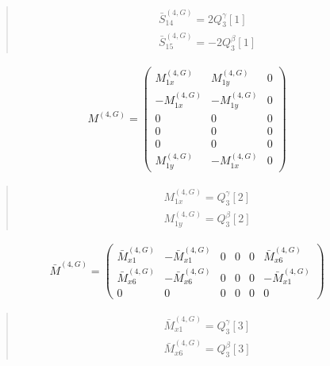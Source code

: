 \documentclass[fleqn,10pt]{jsarticle}
\begin{document}
\begin{quote}
\begin{align*}
& \bar{S}^{(4,G)}_{14} = 2 Q_{3}^{\gamma}[1] \\
& \bar{S}^{(4,G)}_{15} = - 2 Q_{3}^{\beta}[1]
\end{align*}
\end{quote}
\begin{align*}
M^{(4,G)} = \begin{pmatrix} M^{(4,G)}_{1x} & M^{(4,G)}_{1y} & 0 \\ - M^{(4,G)}_{1x} & - M^{(4,G)}_{1y} & 0 \\ 0 & 0 & 0 \\ 0 & 0 & 0 \\ 0 & 0 & 0 \\ M^{(4,G)}_{1y} & - M^{(4,G)}_{1x} & 0 \end{pmatrix}
\end{align*}
\begin{quote}
\begin{align*}
& M^{(4,G)}_{1x} = Q_{3}^{\gamma}[2] \\
& M^{(4,G)}_{1y} = Q_{3}^{\beta}[2]
\end{align*}
\end{quote}
\begin{align*}
\bar{M}^{(4,G)} = \begin{pmatrix} \bar{M}^{(4,G)}_{x1} & - \bar{M}^{(4,G)}_{x1} & 0 & 0 & 0 & \bar{M}^{(4,G)}_{x6} \\ \bar{M}^{(4,G)}_{x6} & - \bar{M}^{(4,G)}_{x6} & 0 & 0 & 0 & - \bar{M}^{(4,G)}_{x1} \\ 0 & 0 & 0 & 0 & 0 & 0 \end{pmatrix}
\end{align*}
\begin{quote}
\begin{align*}
& \bar{M}^{(4,G)}_{x1} = Q_{3}^{\gamma}[3] \\
& \bar{M}^{(4,G)}_{x6} = Q_{3}^{\beta}[3]
\end{align*}
\end{quote}
\end{document}
